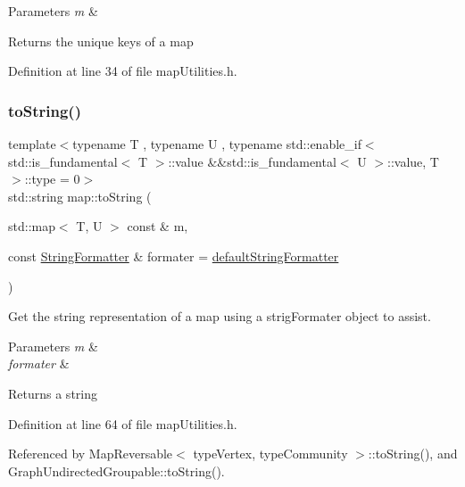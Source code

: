 \begin{DoxyParams}{Parameters}
{\em m} & \\
\hline
\end{DoxyParams}
\begin{DoxyReturn}{Returns}
the unique keys of a map 
\end{DoxyReturn}


Definition at line 34 of file map\+Utilities.\+h.

\mbox{\label{namespacemap_a7df0c3b516d256b69506233979c2d9e5}} 
\subsubsection{\texorpdfstring{to\+String()}{toString()}}
{\footnotesize\ttfamily template$<$typename T , typename U , typename std\+::enable\+\_\+if$<$ std\+::is\+\_\+fundamental$<$ T $>$\+::value \&\&std\+::is\+\_\+fundamental$<$ U $>$\+::value, T $>$\+::type  = 0$>$ \\
std\+::string map\+::to\+String (\begin{DoxyParamCaption}\item[{std\+::map$<$ T, U $>$ const \&}]{m,  }\item[{const \hyperlink{classStringFormatter}{String\+Formatter} \&}]{formater = {\ttfamily \hyperlink{stringFormatter_8h_abf1349c8e24162d0134072aff288f2a2}{default\+String\+Formatter}} }\end{DoxyParamCaption})}

Get the string representation of a map using a strig\+Formater object to assist.


\begin{DoxyParams}{Parameters}
{\em m} & \\
\hline
{\em formater} & \\
\hline
\end{DoxyParams}
\begin{DoxyReturn}{Returns}
a string 
\end{DoxyReturn}


Definition at line 64 of file map\+Utilities.\+h.



Referenced by Map\+Reversable$<$ type\+Vertex, type\+Community $>$\+::to\+String(), and Graph\+Undirected\+Groupable\+::to\+String().

\mbox{\label{namespacemap_a0c7435ff01b38c40e03b70ce95d40bd5}} 
